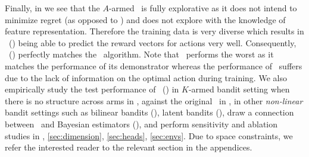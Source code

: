 \documentclass[10pt]{article}
\theoremstyle{plain}
\theoremstyle{definition}
\theoremstyle{remark}
\begin{document}
Finally, in  we see that the $A$-armed \unif\ is fully explorative as it does not intend to minimize regret (as opposed to \ts) and does not explore with the knowledge of feature representation. Therefore the training data is very diverse which results in \pred\ (\gt) being able to predict the reward vectors for actions very well. Consequently, \pred\ (\gt) perfectly matches the \linucb\ algorithm. Note that \ad\ performs the worst as it matches the performance of its demonstrator whereas the performance of \dptg\ suffers due to the lack of information on the optimal action during training.
We also empirically study the test performance of \pred\ (\gt) in $K$-armed bandit setting when there is no structure across arms in , against the original \dpt\ in ,
in other \textit{non-linear} bandit settings such as bilinear bandits (), latent bandits (), draw a connection between \pred\ and Bayesian estimators (), and perform sensitivity and ablation studies in , \ref{sec:dimension}, \ref{sec:heads}, \ref{sec:envs}.
Due to space constraints, we refer the interested reader to the relevant section in the appendices.
\end{document}
